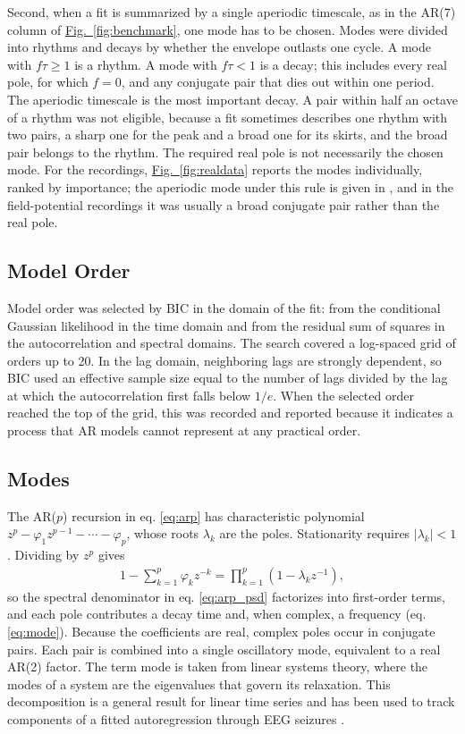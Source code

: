 \documentclass[pdflatex,sn-mathphys-num]{sn-jnl}
\newcommand{\figpanel}[2]{\hyperref[#1]{Fig.~\ref*{#1}#2}}
\begin{document}
Second, when a fit is summarized by a single aperiodic timescale, as in the AR(7) column of \figpanel{fig:benchmark}{}, one mode has to be chosen. Modes were divided into rhythms and decays by whether the envelope outlasts one cycle. A mode with $f\tau \geq 1$ is a rhythm. A mode with $f\tau < 1$ is a decay; this includes every real pole, for which $f = 0$, and any conjugate pair that dies out within one period. The aperiodic timescale is the most important decay. A pair within half an octave of a rhythm was not eligible, because a fit sometimes describes one rhythm with two pairs, a sharp one for the peak and a broad one for its skirts, and the broad pair belongs to the rhythm. The required real pole is not necessarily the chosen mode. For the recordings, \figpanel{fig:realdata}{} reports the modes individually, ranked by importance; the aperiodic mode under this rule is given in , and in the field-potential recordings it was usually a broad conjugate pair rather than the real pole.

\subsection{Model Order}

Model order was selected by BIC \cite{schwarz_estimating_1978} in the domain of the fit: from the conditional Gaussian likelihood in the time domain and from the residual sum of squares in the autocorrelation and spectral domains. The search covered a log-spaced grid of orders up to 20. In the lag domain, neighboring lags are strongly dependent, so BIC used an effective sample size equal to the number of lags divided by the lag at which the autocorrelation first falls below $1/e$. When the selected order reached the top of the grid, this was recorded and reported because it indicates a process that AR models cannot represent at any practical order.

\subsection{Modes}

The AR($p$) recursion in eq. \ref{eq:arp} has characteristic polynomial $z^p - \varphi_1 z^{p-1} - \cdots - \varphi_p$, whose roots $\lambda_k$ are the poles. Stationarity requires $|\lambda_k| < 1$. Dividing by $z^p$ gives
\begin{align}
1 - \sum_{k=1}^{p} \varphi_k z^{-k} = \prod_{k=1}^{p} (1 - \lambda_k z^{-1}), \label{eq:factor}
\end{align}
so the spectral denominator in eq. \ref{eq:arp_psd} factorizes into first-order terms, and each pole contributes a decay time and, when complex, a frequency (eq. \ref{eq:mode}). Because the coefficients are real, complex poles occur in conjugate pairs. Each pair is combined into a single oscillatory mode, equivalent to a real AR(2) factor. The term mode is taken from linear systems theory, where the modes of a system are the eigenvalues that govern its relaxation. This decomposition is a general result for linear time series \cite{west_time_1997} and has been used to track components of a fitted autoregression through EEG seizures \cite{west_evaluation_1999}.
\end{document}
